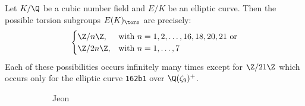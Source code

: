 \begin{frame}[plain]
\small
\begin{thm}
Let $K/\Q$ be a cubic number field and $E/K$ be an elliptic curve. Then the possible torsion subgroups $E(K)_\tors$ are precisely:
	\[
	\begin{cases}
	\Z/n\Z, & \text{with } n=1,2,\ldots,16,18,20,21 \text{ or} \\
	\Z/2n\Z, & \text{with }n=1,\ldots,7
	\end{cases}
	\] 
Each of these possibilities occurs infinitely many times except for $\Z/21\Z$ which occurs only for the elliptic curve \texttt{162b1} over $\Q(\zeta_9)^+$.
\end{thm}
	\begin{figure}[h]
	\centering
	\begin{subfigure}{0.10\textwidth}
	\captionsetup{labelformat=empty}
	\centering
	\caption{\hspace{0.2cm}\scriptsize{Jeon}}
	\end{subfigure} \quad\quad
	\begin{subfigure}{0.10\textwidth}
	\captionsetup{labelformat=empty}
	\centering

\end{subfigure}
\end{figure}
\end{frame}
